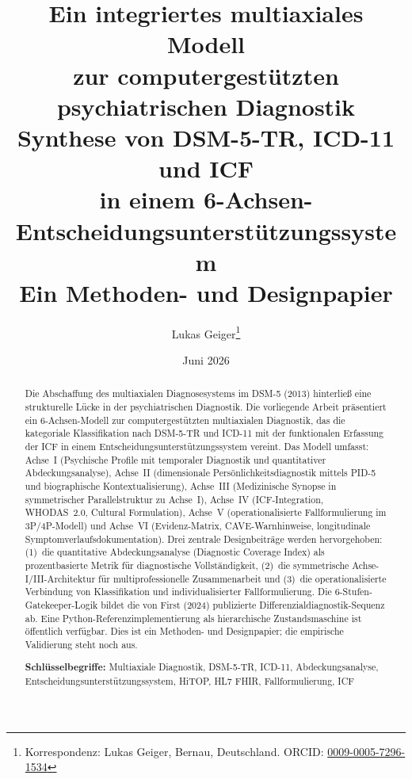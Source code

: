 \documentclass[11pt,a4paper]{article}
\begin{document}

\title{\textbf{\huge Ein integriertes multiaxiales Modell\\zur computergest\"utzten psychiatrischen Diagnostik}\\[0.5em]
\Large Synthese von DSM-5-TR, ICD-11 und ICF\\in einem 6-Achsen-Entscheidungsunterst\"utzungssystem\\[0.3em]
\large Ein Methoden- und Designpapier}

\author[1]{Lukas Geiger\thanks{Korrespondenz: Lukas Geiger, Bernau, Deutschland. ORCID: \href{https://orcid.org/0009-0005-7296-1534}{0009-0005-7296-1534}}}

\date{Juni 2026}

\maketitle

\begin{abstract}
\noindent Die Abschaffung des multiaxialen Diagnosesystems im DSM-5 (2013) hinterlie\ss{} eine strukturelle L\"ucke in der psychiatrischen Diagnostik. Die vorliegende Arbeit pr\"asentiert ein 6-Achsen-Modell zur computergest\"utzten multiaxialen Diagnostik, das die kategoriale Klassifikation nach DSM-5-TR und ICD-11 mit der funktionalen Erfassung der ICF in einem Entscheidungsunterst\"utzungssystem vereint. Das Modell umfasst: Achse~I (Psychische Profile mit temporaler Diagnostik und quantitativer Abdeckungsanalyse), Achse~II (dimensionale Pers\"onlichkeitsdiagnostik mittels PID-5 und biographische Kontextualisierung), Achse~III (Medizinische Synopse in symmetrischer Parallelstruktur zu Achse~I), Achse~IV (ICF-Integration, WHODAS~2.0, Cultural Formulation), Achse~V (operationalisierte Fallformulierung im 3P/4P-Modell) und Achse~VI (Evidenz-Matrix, CAVE-Warnhinweise, longitudinale Symptomverlaufsdokumentation). Drei zentrale Designbeitr\"age werden hervorgehoben: (1)~die quantitative Abdeckungsanalyse (Diagnostic Coverage Index) als prozentbasierte Metrik f\"ur diagnostische Vollst\"andigkeit, (2)~die symmetrische Achse-I/III-Architektur f\"ur multiprofessionelle Zusammenarbeit und (3)~die operationalisierte Verbindung von Klassifikation und individualisierter Fallformulierung. Die 6-Stufen-Gatekeeper-Logik bildet die von First (2024) publizierte Differenzialdiagnostik-Sequenz ab. Eine Python-Referenzimplementierung als hierarchische Zustandsmaschine ist \"offentlich verf\"ugbar. Dies ist ein Methoden- und Designpapier; die empirische Validierung steht noch aus.

\vspace{0.5em}
\noindent \textbf{Schl\"usselbegriffe:} Multiaxiale Diagnostik, DSM-5-TR, ICD-11, Abdeckungsanalyse, Entscheidungsunterst\"utzungssystem, HiTOP, HL7 FHIR, Fallformulierung, ICF
\end{abstract}
\end{document}
